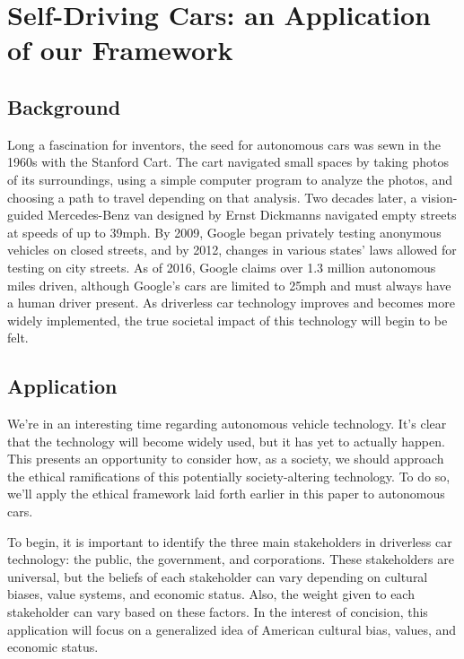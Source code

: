 \section{Self-Driving Cars: an Application of our Framework}
\label{sec:-application}

\subsection{Background}
Long a fascination for inventors, the seed for autonomous cars was sewn 
in the 1960s with the Stanford Cart\cite{moravec1990stanford}. The cart 
navigated small spaces by taking photos of its surroundings, using a 
simple computer program to analyze the photos, and choosing a path to travel depending on that analysis.
Two decades later, a vision-guided Mercedes-Benz van designed 
by Ernst Dickmanns navigated empty streets at speeds of up to 39mph. By 
2009, Google began privately testing anonymous vehicles on closed 
streets, and by 2012, changes in various states' laws allowed for 
testing on city streets. As of 2016, Google claims over 1.3 million 
autonomous miles driven, although Google's cars are limited 
to 25mph and must always have a human driver present.\cite{wired}  As 
driverless car technology improves and becomes more widely implemented, 
the true societal impact of this technology will begin to be felt.

\subsection{Application}

We're in an interesting time regarding autonomous vehicle technology. 
It's clear that the technology will become widely used, but it has yet 
to actually happen. This presents an opportunity to consider how, as a 
society, we should approach the ethical ramifications of this
potentially society-altering technology. To do so, we'll apply the 
ethical framework laid forth earlier in this paper to autonomous cars.

To begin, it is important to identify the three main stakeholders in 
driverless car technology: the public, the government, and corporations. 
These stakeholders are universal, but the beliefs of each stakeholder can
vary depending on cultural biases, value systems, and economic status. Also,
the weight given to each stakeholder can vary based on these factors. In the 
interest of concision, this application will focus on a generalized idea of American 
cultural bias, values, and economic status.

